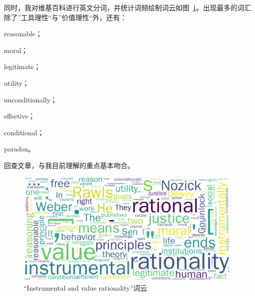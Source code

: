 同时，我对维基百科进行英文分词，并统计词频绘制词云如图~\ref{F:1}。出现最多的词汇除了”工具理性“与”价值理性“外，还有：
\begin{enumerate*}[label=(\alph*)]
    \item reasonable；
    \item moral；
    \item legitimate；
    \item utility；
    \item unconditionally；
    \item effective；
    \item conditional；
    \item paradox。
\end{enumerate*}
回查文章，与我目前理解的重点基本吻合。
\begin{figure}[H]
    \centering
    \includegraphics[width=.8\textwidth]{wordcloud/工具理性.png}
    \caption{“Instrumental and value rationality”词云}\label{F:1}
\end{figure}

